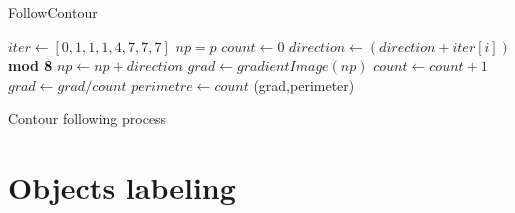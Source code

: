 \begin{algorithm}
\caption{FollowContour}\label{al:ContourFollowing}
\begin{algorithmic}[1]
\State $iter \gets [0,1,1,1,4,7,7,7]$
\State $np = p$ 
\State $count \gets 0$
\Repeat 
{}
	\State $direction \gets (direction + iter[i])$ \textbf{ mod 8}
		\State $np \gets np+direction$
		\State $grad \gets gradientImage(np)$
		\State $count \gets count+1$
	\EndIf
\EndFor
{}
\State $grad\gets grad/count$
\State $perimetre \gets count $
\State \Return (grad,perimeter)
\EndProcedure
\end{algorithmic}
\caption{Contour following process}
\end{algorithm}

\section{Objects labeling}